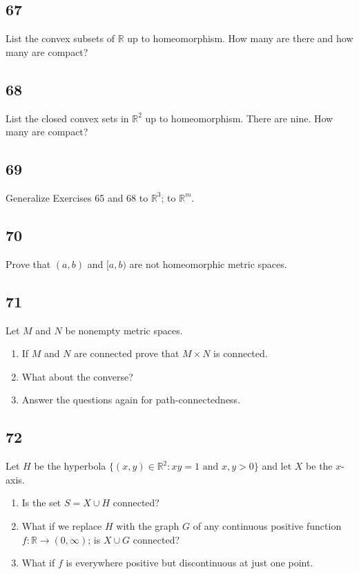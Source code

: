 \documentclass{amsart}
\begin{document}
\subsection*{67}
List the convex subsets of $\mathbb{R}$ up to homeomorphism. How many are there and how many are compact?

\subsection*{68}
List the closed convex sets in $\mathbb{R}^2$ up to homeomorphism. There are nine. How many are compact?

\subsection*{69}
Generalize Exercises 65 and 68 to $\mathbb{R}^3$; to $\mathbb{R}^m$.

\subsection*{70}
Prove that $(a,b)$ and $[a,b)$ are not homeomorphic metric spaces.

\subsection*{71}
Let $M$ and $N$ be nonempty metric spaces.
\begin{enumerate}[label=(\alph*)]
\item If $M$ and $N$ are connected prove that $M \times N$ is connected.
\item What about the converse?
\item Answer the questions again for path-connectedness.
\end{enumerate}

\subsection*{72}
Let $H$ be the hyperbola $\{(x,y) \in \mathbb{R}^2 : xy = 1 \text{ and } x,y > 0\}$ and let $X$ be the $x$-axis.
\begin{enumerate}[label=(\alph*)]
\item Is the set $S = X \cup H$ connected?
\item What if we replace $H$ with the graph $G$ of any continuous positive function $f : \mathbb{R} \to (0,\infty)$; is $X \cup G$ connected?
\item What if $f$ is everywhere positive but discontinuous at just one point.
\end{enumerate}
\end{document}
